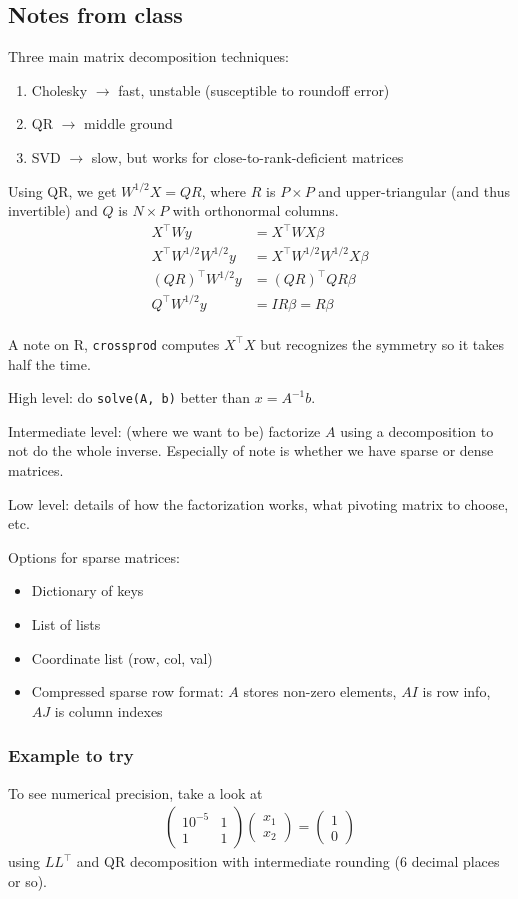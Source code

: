 \documentclass{article}
\begin{document}
\subsection{Notes from class}
Three main matrix decomposition techniques:
\begin{enumerate}[1.]
\item Cholesky $\rightarrow$ fast, unstable (susceptible to roundoff error)
\item QR $\rightarrow$ middle ground
\item SVD $\rightarrow$ slow, but works for close-to-rank-deficient matrices
\end{enumerate}

Using QR, we get $W^{1/2}X=QR$, where $R$ is $P\times P$ and upper-triangular (and thus invertible) and $Q$ is $N\times P$ with
orthonormal columns.
\begin{align*}
X^\top Wy&=X^\top W X\beta\\
X^\top W^{1/2} W^{1/2}y&=X^\top W^{1/2}W^{1/2}X\beta\\
(QR)^\top W^{1/2} y&=(QR)^\top QR\beta\\
Q^\top W^{1/2}y&=I R\beta=R\beta\\
\end{align*}

A note on R, \texttt{crossprod} computes $X^\top X$ but recognizes the symmetry so it takes half the time.

High level: do \texttt{solve(A, b)} better than $x=A^{-1}b$.

Intermediate level: (where we want to be) factorize $A$ using a decomposition to not do the whole inverse. Especially
of note is whether we have sparse or dense matrices.

Low level: details of how the factorization works, what pivoting matrix to choose, etc.

Options for sparse matrices:
\begin{itemize}
\item Dictionary of keys
\item List of lists
\item Coordinate list (row, col, val)
\item Compressed sparse row format: $A$ stores non-zero elements, $AI$ is row info, $AJ$ is column indexes
\end{itemize}

\subsubsection{Example to try}
To see numerical precision, take a look at
\begin{align*}
\begin{pmatrix}10^{-5} & 1 \\ 1 & 1\end{pmatrix}
\begin{pmatrix} x_1\\x_2\end{pmatrix}
=
\begin{pmatrix}1\\0\end{pmatrix}
\end{align*}
using $LL^\top$ and QR decomposition with intermediate rounding (6 decimal places or so).
\end{document}
